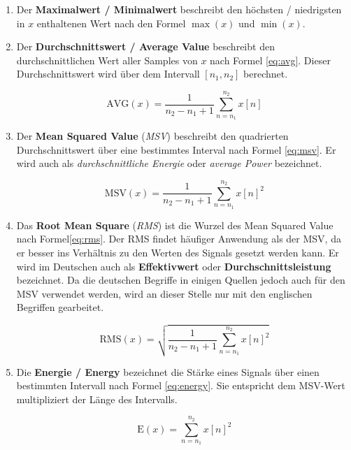 \begin{enumerate}[leftmargin=*]
	
\item Der \textbf{Maximalwert / Minimalwert} beschreibt den höchsten / niedrigsten in  $x$ enthaltenen Wert nach den Formel $\max(x)$ und $\min(x)$.
	
\item Der \textbf{Durchschnittswert / Average Value} beschreibt den durchschnittlichen Wert aller Samples von $x$ nach Formel \ref{eq:avg}. Dieser Durchschnittswert wird über dem Intervall $[n_1, n_2]$  berechnet.

\begin{equation}
\text{AVG}(x) = \frac{1}{n_2 - n_1 + 1} \sum_{n = n_1}^{n_2} x[n]
\label{eq:avg}
\end{equation}

\item Der \textbf{Mean Squared Value} (\emph{MSV}) beschreibt den quadrierten Durchschnittswert über eine bestimmtes Interval nach Formel \ref{eq:msv}. Er wird auch als \emph{durchschnittliche Energie} oder \emph{average Power} bezeichnet.

\begin{equation}
\text{MSV}(x) = \frac{1}{n_2 - n_1 + 1} \sum_{n = n_1}^{n_2} x[n]^2
\label{eq:msv}
\end{equation}

\item Das \textbf{Root Mean Square} (\emph{RMS}) ist die Wurzel des Mean Squared Value nach Formel\ref{eq:rms}. Der RMS findet häufiger Anwendung als der MSV, da er besser ins Verhältnis zu den Werten des Signals gesetzt werden kann. Er wird im Deutschen auch als \textbf{Effektivwert} oder \textbf{Durchschnittsleistung} bezeichnet. Da die deutschen Begriffe in einigen Quellen jedoch auch für den MSV verwendet werden, wird an dieser Stelle nur mit den englischen Begriffen gearbeitet.

\begin{equation}
\text{RMS}(x) = \sqrt{\frac{1}{n_2 - n_1 + 1} \sum_{n = n_1}^{n_2} x[n]^2}
\label{eq:rms}
\end{equation}

\item Die \textbf{Energie / Energy} bezeichnet die \glqq Stärke \grqq{} eines Signals über einen bestimmten Intervall nach Formel \ref{eq:energy}. Sie entspricht dem MSV-Wert multipliziert der Länge des Intervalls. \cite[S. 27-28]{dspMichigan}

\begin{equation}
\text{E}(x) = \sum_{n = n_1}^{n_2} x[n]^2
\label{eq:energy}
\end{equation}
	
\end{enumerate}	

